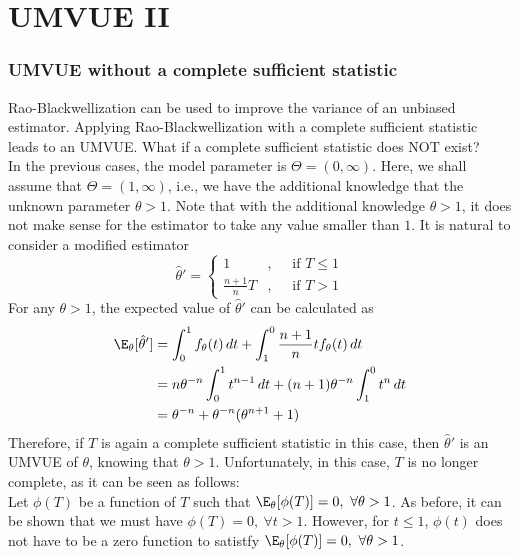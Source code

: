 \chapter{UMVUE II}

\subsection{UMVUE without a complete sufficient statistic}
Rao-Blackwellization can be used to improve the variance of an unbiased estimator. Applying Rao-Blackwellization with a complete sufficient statistic leads to an UMVUE. What if a complete sufficient statistic does NOT exist? \\

\noindent In the previous cases, the model parameter is $\Theta = (0, \infty)$. Here, we shall assume that $\Theta = (1, \infty)$, i.e., we have the additional knowledge that the unknown parameter $\theta > 1$. Note that with the additional knowledge $\theta > 1$, it does not make sense for the estimator to take any value smaller than $1$. It is natural to consider a modified estimator
\[
    \hat{\theta}' = \begin{cases}
        1               & , \quad \text{  if } T \leq 1 \\
        \frac{n+1}{n} T & , \quad \text{  if } T > 1
    \end{cases}
\]
For any $\theta > 1$, the expected value of $\hat{\theta}'$ can be calculated as
\begin{align*}
    \E_\theta[\hat{\theta}'] & = \int_{0}^{1} f_\theta(t) \, dt + \int_{1}^{0} \frac{n+1}{n} t f_\theta(t) \, dt   \\
                             & = n\theta^{-n} \int_{0}^{1} t^{n-1} \, dt + (n+1)\theta^{-n} \int_{1}^{0} t^n \, dt \\
                             & = \theta^{-n} + \theta^{-n}(\theta^{n+1} + 1)
\end{align*}
Therefore, if $T$ is again a complete sufficient statistic in this case, then $\hat{\theta}'$ is an UMVUE of $\theta$, knowing that $\theta > 1$. Unfortunately, in this case, $T$ is no longer complete, as it can be seen as follows: \\

Let $\phi(T)$ be a function of $T$ such that $\E_\theta[\phi(T)] = 0, \ \forall \theta > 1$. As before, it can be shown that we must have $\phi(T) = 0, \ \forall t > 1$. However, for $t \leq 1$, $\phi(t)$ does not have to be a zero function to satistfy $\E_\theta[\phi(T)] = 0, \ \forall \theta > 1$. \\

